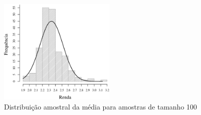 \begin{figure}[h]
\centering
	\includegraphics[width=0.50\textwidth]{plots/histogram_renda_n100.eps}
	\caption{Distribuição amostral da média para amostras de tamanho 100}
	\label{fig:m100}
\end{figure}

\FloatBarrier
